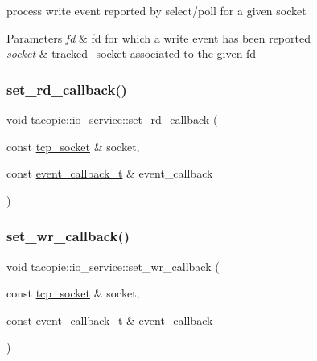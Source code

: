 process write event reported by select/poll for a given socket


\begin{DoxyParams}{Parameters}
{\em fd} & fd for which a write event has been reported \\
\hline
{\em socket} & \hyperlink{structtacopie_1_1io__service_1_1tracked__socket}{tracked\+\_\+socket} associated to the given fd \\
\hline
\end{DoxyParams}
\mbox{\label{classtacopie_1_1io__service_a8094c1fec76c6821cc0c008fe524c89a}} 
\subsubsection{\texorpdfstring{set\+\_\+rd\+\_\+callback()}{set\_rd\_callback()}}
{\footnotesize\ttfamily void tacopie\+::io\+\_\+service\+::set\+\_\+rd\+\_\+callback (\begin{DoxyParamCaption}\item[{const \hyperlink{classtacopie_1_1tcp__socket}{tcp\+\_\+socket} \&}]{socket,  }\item[{const \hyperlink{classtacopie_1_1io__service_abb66850c32d9c724f4418d77bd04bcfd}{event\+\_\+callback\+\_\+t} \&}]{event\+\_\+callback }\end{DoxyParamCaption})}

\mbox{\label{classtacopie_1_1io__service_a7c4f56c7790c7ba52b09837a42aaffb1}} 
\subsubsection{\texorpdfstring{set\+\_\+wr\+\_\+callback()}{set\_wr\_callback()}}
{\footnotesize\ttfamily void tacopie\+::io\+\_\+service\+::set\+\_\+wr\+\_\+callback (\begin{DoxyParamCaption}\item[{const \hyperlink{classtacopie_1_1tcp__socket}{tcp\+\_\+socket} \&}]{socket,  }\item[{const \hyperlink{classtacopie_1_1io__service_abb66850c32d9c724f4418d77bd04bcfd}{event\+\_\+callback\+\_\+t} \&}]{event\+\_\+callback }\end{DoxyParamCaption})}

